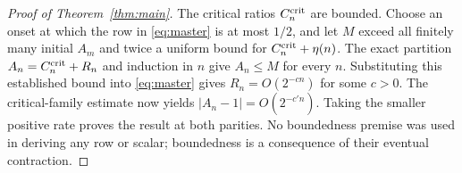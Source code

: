 \begin{proof}[Proof of Theorem~\ref{thm:main}]
The critical ratios $C_n^{\mathrm{crit}}$ are bounded. Choose an onset at
which the row in \eqref{eq:master} is at most $1/2$, and let $M$
exceed all finitely many initial $A_m$ and twice a uniform bound for
$C_n^{\mathrm{crit}}+\eta(n)$.  The exact partition
$A_n=C_n^{\mathrm{crit}}+R_n$ and induction in $n$ give $A_n\leq M$ for
every $n$. Substituting this established bound into
\eqref{eq:master} gives $R_n=O(2^{-cn})$ for some $c>0$.
The critical-family estimate now yields
$|A_n-1|=O(2^{-c'n})$. Taking the smaller positive rate proves the
result at both parities. No boundedness premise was used in deriving
any row or scalar; boundedness is a consequence of their eventual
contraction.
\end{proof}

